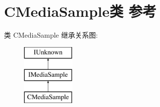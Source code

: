 \hypertarget{class_c_media_sample}{}\section{C\+Media\+Sample类 参考}
\label{class_c_media_sample}
类 C\+Media\+Sample 继承关系图\+:\begin{figure}[H]
\begin{center}
\leavevmode
\includegraphics[height=3.000000cm]{class_c_media_sample}
\end{center}
\end{figure}
